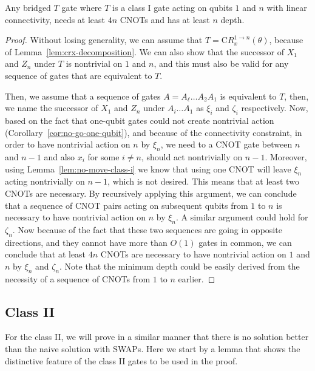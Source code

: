 \begin{theorem}\label{thm:no-go-class-i}
  Any bridged $T$ gate where $T$ is a class I gate acting on qubits $1$ and $n$ with linear connectivity, needs at least $4n$ CNOTs and has at least $n$ depth.
\end{theorem}
\begin{proof}
  Without losing generality, we can assume that $T = \mathrm{C}R_x^{1\to n}(\theta)$, because of Lemma~\ref{lem:crx-decomposition}. We can also show that the successor of $X_1$ and $Z_n$ under $T$ is nontrivial on $1$ and $n$, and this must also be valid for any sequence of gates that are equivalent to $T$.

  Then, we assume that a sequence of gates $A = A_\ell \dots A_2 A_1$ is equivalent to $T$, then, we name the successor of $X_1$ and $Z_n$ under $A_i \dots A_1$ as $\xi_i$ and $\zeta_i$ respectively. Now, based on the fact that one-qubit gates could not create nontrivial action (Corollary~\ref{cor:no-go-one-qubit}), and because of the connectivity constraint, in order to have nontrivial action on $n$ by $\xi_n$, we need to a CNOT gate between $n$ and $n-1$ and also $x_i$ for some $i \ne n$, should act nontrivially on $n-1$. Moreover, using Lemma~\ref{lem:no-move-class-i} we know that using one CNOT will leave $\xi_n$ acting nontrivially on $n-1$, which is not desired. This means that at least two CNOTs are necessary. By recursively applying this argument, we can conclude that a sequence of CNOT pairs acting on subsequent qubits from $1$ to $n$ is necessary to have nontrivial action on $n$ by $\xi_n$. A similar argument could hold for $\zeta_n$. Now because of the fact that these two sequences are going in opposite directions, and they cannot have more than $O(1)$ gates in common, we can conclude that at least $4n$ CNOTs are necessary to have nontrivial action on $1$ and $n$ by $\xi_n$ and $\zeta_n$. Note that the minimum depth could be easily derived from the necessity of a sequence of CNOTs from $1$ to $n$ earlier.
\end{proof}

\subsection{Class II}

For the class II, we will prove in a similar manner that there is no solution better than the naive solution with SWAPs. Here we start by a lemma that shows the distinctive feature of the class II gates to be used in the proof.

